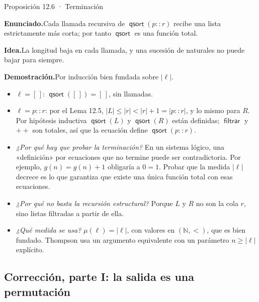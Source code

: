 \documentclass[11pt,a4paper]{article}
\newcommand{\campo}[1]{\par\smallskip\noindent\textbf{#1}\enspace}
\newcommand{\enunciado}{\campo{Enunciado.}}
\newcommand{\idea}{\campo{Idea.}}
\newcommand{\prueba}{\campo{Demostración.}}
\newcommand{\concat}{\mathbin{+\!\!+}}
\newcommand{\qs}{\operatorname{\mathsf{qsort}}}
\newcommand{\filt}{\operatorname{\mathsf{filtrar}}}
\newcommand{\len}[1]{\lvert #1\rvert}
\begin{document}
\begin{resultado}{Proposición 12.6 · Terminación}
\enunciado Cada llamada recursiva de \(\qs(p::r)\) recibe una lista
estrictamente más corta; por tanto \(\qs\) es una función total.

\idea La longitud baja en cada llamada, y una sucesión de naturales no puede
bajar para siempre.

\prueba Por inducción bien fundada sobre \(\len\ell\).
\begin{itemize}
  \item \(\ell=[\,]\): \(\qs([\,])=[\,]\), sin llamadas.
  \item \(\ell=p::r\): por el Lema 12.5,
    \(\len L\leq\len r<\len r+1=\len{p::r}\), y lo mismo para \(R\). Por
    hipótesis inductiva \(\qs(L)\) y \(\qs(R)\) están definidas; \(\filt\) y
    \(\concat\) son totales, así que la ecuación define \(\qs(p::r)\).
\end{itemize}
\end{resultado}

\begin{trampa}
\begin{itemize}
  \item \emph{¿Por qué hay que probar la terminación?} En un sistema lógico,
    una «definición» por ecuaciones que no termine puede ser contradictoria.
    Por ejemplo, \(g(n)=g(n)+1\) obligaría a \(0=1\). Probar que la medida
    \(\len\ell\) decrece es lo que garantiza que existe una única función
    total con esas ecuaciones.
  \item \emph{¿Por qué no basta la recursión estructural?} Porque \(L\) y
    \(R\) no son la cola \(r\), sino listas filtradas a partir de ella.
  \item \emph{¿Qué medida se usa?} \(\mu(\ell)=\len\ell\), con valores en
    \((\mathbb N,<)\), que es bien fundado. Thompson usa un argumento
    equivalente con un parámetro \(n\geq\len\ell\) explícito.
\end{itemize}
\end{trampa}

\subsection{Corrección, parte I: la salida es una permutación}
\end{document}
